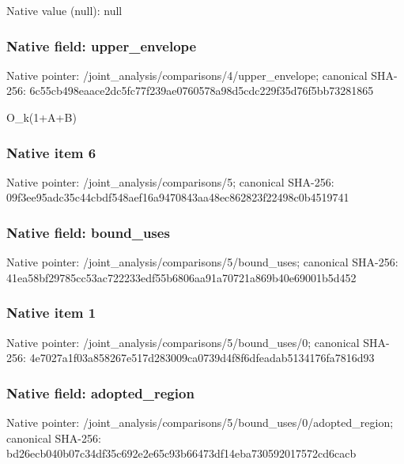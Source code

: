 \documentclass[10pt,a4paper]{article}
\begin{document}
Native value (null): null

\subsubsection{Native field: upper\_\allowbreak{}envelope}
Native pointer: /joint\_\allowbreak{}analysis/comparisons/4/upper\_\allowbreak{}envelope; canonical SHA-256: 6c55cb498eaace2dc5fc77f239ae0760578a98d5cdc229f35d76f5bb73281865

\begingroup\raggedright\sloppy O\_\allowbreak{}k(1+A+B)\par\endgroup

\subsubsection{Native item 6}
Native pointer: /joint\_\allowbreak{}analysis/comparisons/5; canonical SHA-256: 09f3ee95adc35c44cbdf548aef16a9470843aa48ec862823f22498c0b4519741

\subsubsection{Native field: bound\_\allowbreak{}uses}
Native pointer: /joint\_\allowbreak{}analysis/comparisons/5/bound\_\allowbreak{}uses; canonical SHA-256: 41ea58bf29785cc53ac722233edf55b6806aa91a70721a869b40e69001b5d452

\subsubsection{Native item 1}
Native pointer: /joint\_\allowbreak{}analysis/comparisons/5/bound\_\allowbreak{}uses/0; canonical SHA-256: 4e7027a1f03a858267e517d283009ca0739d4f8f6dfeadab5134176fa7816d93

\subsubsection{Native field: adopted\_\allowbreak{}region}
Native pointer: /joint\_\allowbreak{}analysis/comparisons/5/bound\_\allowbreak{}uses/0/adopted\_\allowbreak{}region; canonical SHA-256: bd26ecb040b07c34df35c692e2e65c93b66473df14eba730592017572cd6cacb
\end{document}
